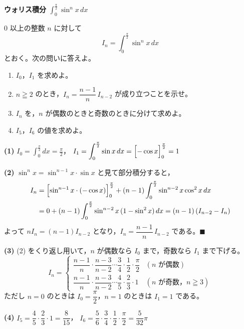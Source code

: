 \documentclass[11pt]{article}
\begin{document}
\begin{center}
  {\sffamily\bfseries\LARGE ウォリス積分 $\displaystyle\int_0^{\frac{\pi}{2}} \sin^n x\,dx$}
\end{center}
\vspace{-2mm}

\begin{mondai}
$0$ 以上の整数 $n$ に対して
\[
  I_n = \int_0^{\frac{\pi}{2}} \sin^n x\,dx
\]
とおく。次の問いに答えよ。
\begin{enumerate}
  \item $I_0$，$I_1$ を求めよ。
  \item $n \geqq 2$ のとき，$I_n = \dfrac{n-1}{n}\,I_{n-2}$ が成り立つことを示せ。
  \item $I_n$ を，$n$ が偶数のときと奇数のときに分けて求めよ。
  \item $I_5$，$I_6$ の値を求めよ。
\end{enumerate}
\end{mondai}

\begin{kaitou}
\textbf{(1)}\quad
$I_0 = \displaystyle\int_0^{\frac{\pi}{2}} dx = \frac{\pi}{2}$，\qquad
$I_1 = \displaystyle\int_0^{\frac{\pi}{2}} \sin x\,dx = \Bigl[-\cos x\Bigr]_0^{\frac{\pi}{2}} = 1$

\smallskip
\textbf{(2)}\quad
$\sin^n x = \sin^{n-1}x \cdot \sin x$ と見て部分積分すると，
\begin{align*}
  I_n &= \Bigl[\sin^{n-1}x \cdot (-\cos x)\Bigr]_0^{\frac{\pi}{2}}
         + (n-1)\int_0^{\frac{\pi}{2}} \sin^{n-2}x \cos^2 x\,dx \\
      &= 0 + (n-1)\int_0^{\frac{\pi}{2}} \sin^{n-2}x\,(1-\sin^2 x)\,dx
       = (n-1)\,(I_{n-2} - I_n)
\end{align*}
よって $n I_n = (n-1) I_{n-2}$ となり，$I_n = \dfrac{n-1}{n}\,I_{n-2}$ である。\hfill$\blacksquare$

\smallskip
\textbf{(3)}\quad
(2) をくり返し用いて，$n$ が偶数なら $I_0$ まで，奇数なら $I_1$ まで下げる。
\[
  I_n =
  \begin{cases}
    \dfrac{n-1}{n}\cdot\dfrac{n-3}{n-2}\cdots\dfrac{3}{4}\cdot\dfrac{1}{2}\cdot\dfrac{\pi}{2}
      & (n \text{ が偶数}) \\[3ex]
    \dfrac{n-1}{n}\cdot\dfrac{n-3}{n-2}\cdots\dfrac{4}{5}\cdot\dfrac{2}{3}\cdot 1
      & (n \text{ が奇数，} n \geqq 3)
  \end{cases}
\]
ただし $n=0$ のときは $I_0 = \dfrac{\pi}{2}$，$n=1$ のときは $I_1 = 1$ である。

\smallskip
\textbf{(4)}\quad
$I_5 = \dfrac{4}{5}\cdot\dfrac{2}{3}\cdot 1 = \dfrac{8}{15}$，\qquad
$I_6 = \dfrac{5}{6}\cdot\dfrac{3}{4}\cdot\dfrac{1}{2}\cdot\dfrac{\pi}{2} = \dfrac{5}{32}\pi$
\end{kaitou}
\end{document}
